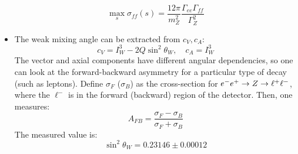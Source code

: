 \begin{itemize}
  \begin{equation}
    \max_s \sigma_{ff}(s) = \frac{12\pi}{m_Z^2} \frac{\Gamma_{ee} \Gamma_{ff}}{\Gamma_Z^2}
  \end{equation}
  \item The weak mixing angle can be extracted from $c_V,c_A$:
  \begin{equation}
    c_V = I^3_W - 2Q\sin^2\theta_W, \quad c_A = I_W^3
  \end{equation}
  The vector and axial components have different angular dependencies, so one can look at the forward-backward asymmetry for a particular type of decay (such as leptons). Define $\sigma_F$ ($\sigma_B$) as the cross-section for $e^{-}e^{+} \rightarrow Z \rightarrow \ell^+\ell^-$, where the $\ell^-$ is in the forward (backward) region of the detector. Then, one measures:
  \begin{equation}
    A_{FB} = \frac{\sigma_F - \sigma_B}{\sigma_F+\sigma_B}
  \end{equation}
  The measured value is:
  \begin{equation}
    \sin^2\theta_W = 0.23146\pm 0.00012
  \end{equation}
\end{itemize}

